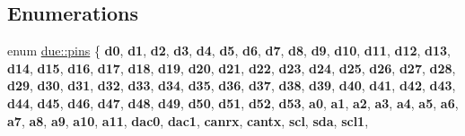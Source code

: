 \subsection*{Enumerations}
\begin{DoxyCompactItemize}
\item 
enum \hyperlink{namespacedue_a8ffa3ec309934ff9db34317e504bcc92}{due\+::pins} \{ \newline
{\bfseries d0}, 
{\bfseries d1}, 
{\bfseries d2}, 
{\bfseries d3}, 
\newline
{\bfseries d4}, 
{\bfseries d5}, 
{\bfseries d6}, 
{\bfseries d7}, 
\newline
{\bfseries d8}, 
{\bfseries d9}, 
{\bfseries d10}, 
{\bfseries d11}, 
\newline
{\bfseries d12}, 
{\bfseries d13}, 
{\bfseries d14}, 
{\bfseries d15}, 
\newline
{\bfseries d16}, 
{\bfseries d17}, 
{\bfseries d18}, 
{\bfseries d19}, 
\newline
{\bfseries d20}, 
{\bfseries d21}, 
{\bfseries d22}, 
{\bfseries d23}, 
\newline
{\bfseries d24}, 
{\bfseries d25}, 
{\bfseries d26}, 
{\bfseries d27}, 
\newline
{\bfseries d28}, 
{\bfseries d29}, 
{\bfseries d30}, 
{\bfseries d31}, 
\newline
{\bfseries d32}, 
{\bfseries d33}, 
{\bfseries d34}, 
{\bfseries d35}, 
\newline
{\bfseries d36}, 
{\bfseries d37}, 
{\bfseries d38}, 
{\bfseries d39}, 
\newline
{\bfseries d40}, 
{\bfseries d41}, 
{\bfseries d42}, 
{\bfseries d43}, 
\newline
{\bfseries d44}, 
{\bfseries d45}, 
{\bfseries d46}, 
{\bfseries d47}, 
\newline
{\bfseries d48}, 
{\bfseries d49}, 
{\bfseries d50}, 
{\bfseries d51}, 
\newline
{\bfseries d52}, 
{\bfseries d53}, 
{\bfseries a0}, 
{\bfseries a1}, 
\newline
{\bfseries a2}, 
{\bfseries a3}, 
{\bfseries a4}, 
{\bfseries a5}, 
\newline
{\bfseries a6}, 
{\bfseries a7}, 
{\bfseries a8}, 
{\bfseries a9}, 
\newline
{\bfseries a10}, 
{\bfseries a11}, 
{\bfseries dac0}, 
{\bfseries dac1}, 
\newline
{\bfseries canrx}, 
{\bfseries cantx}, 
{\bfseries scl}, 
{\bfseries sda}, 
\newline
{\bfseries scl1}, 

\end{DoxyCompactItemize}
